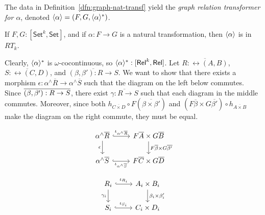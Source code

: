 \documentclass{lmcs}
\theoremstyle{plain}\newtheorem{satz}[thm]{Satz}
\newcommand{\set}{\mathsf{Set}}
\begin{document}
{The data in Definition~\ref{dfn:graph-nat-transf} yield the {\em graph
  relation transformer for $\alpha$}, denoted $\langle {\alpha} \rangle = (F, G,
\langle {\alpha} \rangle^*)$.

\begin{lem}\label{lem:graph-reln-functors}
If $F,G : [\set^k,\set]$, and if $\alpha : F \to G$ is a natural
transformation, then $\langle {\alpha} \rangle$ is in $RT_k$.
\end{lem}
\proof
Clearly, $\langle {\alpha} \rangle^*$ is $\omega$-cocontinuous, so
$\langle {\alpha} \rangle^* : [\mathsf{Rel}^k,\mathsf{Rel}]$. Let $\overline{R :
  \rel(A, B)}$, $\overline{S : \rel(C, D)}$, and $\overline{(\beta,
  \beta') : R \to S}$. We want to show that there exists a morphism
$\epsilon : \alpha^\wedge\overline{R} \to \alpha^\wedge\overline{S}$
such that the diagram on the left below commutes. Since
$\overline{(\beta,\beta') : R \to S}$, there exist $\overline{\gamma : R \to
  S}$ such that each diagram in the middle commutes.
Moreover, since both $h_{\overline{C \times D}} \circ
F(\overline{\beta \times \beta'})$ and $(F\overline{\beta} \times
G\overline{\beta'}) \circ h_{\overline{A \times B}}$ make the diagram
on the right commute, they must be equal.
\begin{figure*}[ht]
  \hspace*{-1in}
  \begin{minipage}[b]{0.25\linewidth}
 {\small    \[
    \begin{tikzcd}
        \alpha^\wedge\overline{R}
        \ar[r, hookrightarrow, "{\iota_{\alpha^\wedge\overline{R}}}"]
        \ar[d, "{\epsilon}"']
        & F\overline{A} \times G\overline{B}
        \ar[d, "{F\overline{\beta} \times G\overline{\beta'}}"] \\
        \alpha^\wedge\overline{S}
        \ar[r, hookrightarrow, "{\iota_{\alpha^\wedge\overline{S}}}"']
        & F\overline{C} \times G\overline{D}
    \end{tikzcd}
    \]}
\end{minipage}\hspace*{0.2in}
\begin{minipage}[b]{0.25\linewidth}
{\small    \[
    \begin{tikzcd}
        R_i
        \ar[d, "{\gamma_i}"']
        \ar[r, hookrightarrow, "{\iota_{R_i}}"]
        &A_i \times B_i
        \ar[d, "{\beta_i \times \beta'_i}"] \\
        S_i
        \ar[r, hookrightarrow, "{\iota_{S_i}}"]
        &C_i \times D_i
    \end{tikzcd}
\]}
\end{minipage}
\end{figure*}}
\end{document}
